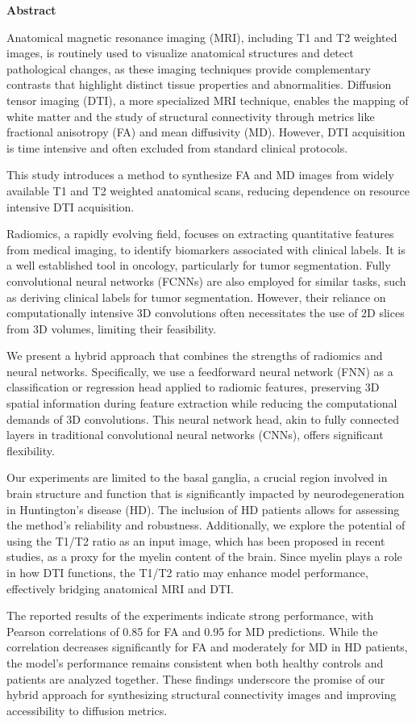 \thispagestyle{plain}
\begin{center}
    \Large
    \textbf{Abstract}
\end{center}
Anatomical magnetic resonance imaging (MRI), including T1 and T2 weighted images, is routinely used to visualize anatomical structures and detect pathological changes, as these imaging techniques provide complementary contrasts that highlight distinct tissue properties and abnormalities. Diffusion tensor imaging (DTI), a more specialized MRI technique, enables the mapping of white matter and the study of structural connectivity through metrics like fractional anisotropy (FA) and mean diffusivity (MD). However, DTI acquisition is time intensive and often excluded from standard clinical protocols.\par
This study introduces a method to synthesize FA and MD images from widely available T1 and T2 weighted anatomical scans, reducing dependence on resource intensive DTI acquisition.\par
Radiomics, a rapidly evolving field, focuses on extracting quantitative features from medical imaging, to identify biomarkers associated with clinical labels. It is a well established tool in oncology, particularly for tumor segmentation. Fully convolutional neural networks (FCNNs) are also employed for similar tasks, such as deriving clinical labels for tumor segmentation. However, their reliance on computationally intensive 3D convolutions often necessitates the use of 2D slices from 3D volumes, limiting their feasibility.\par
We present a hybrid approach that combines the strengths of radiomics and neural networks. Specifically, we use a feedforward neural network (FNN) as a classification or regression head applied to radiomic features, preserving 3D spatial information during feature extraction while reducing the computational demands of 3D convolutions. This neural network head, akin to fully connected layers in traditional convolutional neural networks (CNNs), offers significant flexibility.\par
Our experiments are limited to the basal ganglia, a crucial region involved in brain structure and function that is significantly impacted by neurodegeneration in Huntington’s disease (HD). The inclusion of HD patients allows for assessing the method's reliability and robustness. Additionally, we explore the potential of using the T1/T2 ratio as an input image, which has been proposed in recent studies, as a proxy for the myelin content of the brain. Since myelin plays a role in how DTI functions, the T1/T2 ratio may enhance model performance, effectively bridging anatomical MRI and DTI.\par
The reported results of the experiments indicate strong performance, with Pearson correlations of 0.85 for FA and 0.95 for MD predictions. While the correlation decreases significantly for FA and moderately for MD in HD patients, the model’s performance remains consistent when both healthy controls and patients are analyzed together. These findings underscore the promise of our hybrid approach for synthesizing structural connectivity images and improving accessibility to diffusion metrics.